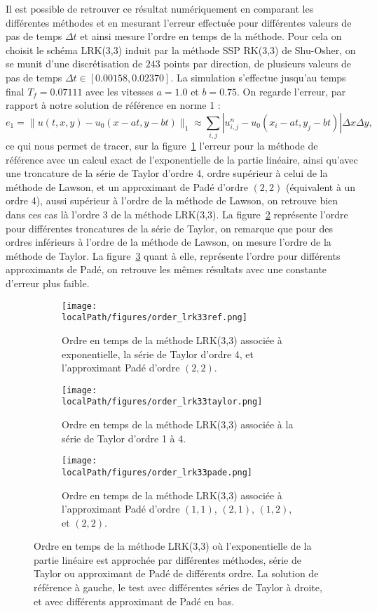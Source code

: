 Il est possible de retrouver ce résultat numériquement en comparant les différentes méthodes et en mesurant l'erreur effectuée pour différentes valeurs de pas de temps $\Delta t$ et ainsi mesure l'ordre en temps de la méthode. Pour cela on choisit le schéma LRK(3,3) induit par la méthode SSP RK(3,3) de Shu-Osher, on se munit d'une discrétisation de $243$ points par direction, de plusieurs valeurs de pas de temps $\Delta t\in[0.00158,0.02370]$. La simulation s'effectue jusqu'au temps final $T_f=0.07111$ avec les vitesses $a=1.0$ et $b=0.75$. On regarde l'erreur, par rapport à notre solution de référence en norme 1 :
$$
  e_1 = \| u(t,x,y) - u_0(x-at,y-bt) \|_1 \approx \sum_{i,j}|u^n_{i,j}-u_0(x_i-at,y_j-bt)|\Delta x\Delta y,
$$
ce qui nous permet de tracer, sur la figure~\ref{fig:lrk33ref} l'erreur pour la méthode de référence avec un calcul exact de l'exponentielle de la partie linéaire, ainsi qu'avec une troncature de la série de Taylor d'ordre 4, ordre supérieur à celui de la méthode de Lawson, et un approximant de Padé d'ordre $(2,2)$ (équivalent à un ordre 4), aussi supérieur à l'ordre de la méthode de Lawson, on retrouve bien dans ces cas là l'ordre 3 de la méthode LRK(3,3). La figure~\ref{fig:lrk33taylor} représente l'ordre pour différentes troncatures de la série de Taylor, on remarque que pour des ordres inférieurs à l'ordre de la méthode de Lawson, on mesure l'ordre de la méthode de Taylor. La figure~\ref{fig:lrk33pade} quant à elle, représente l'ordre pour différents approximants de Padé, on retrouve les mêmes résultats avec une constante d'erreur plus faible.

\begin{figure}
  \centering
  \begin{subfigure}{.45\textwidth}
    \centering
    \texttt{[image: \\localPath/figures/order\_lrk33ref.png]}
    \caption{Ordre en temps de la méthode LRK(3,3) associée à exponentielle, la série de Taylor d'ordre 4, et l'approximant Padé d'ordre $(2,2)$.}
    \label{fig:lrk33ref}
  \end{subfigure}
  \begin{subfigure}{.45\textwidth}
    \centering
    \texttt{[image: \\localPath/figures/order\_lrk33taylor.png]}
    \caption{Ordre en temps de la méthode LRK(3,3) associée à la série de Taylor d'ordre 1 à 4.\\ }
    \label{fig:lrk33taylor}
  \end{subfigure}
  \begin{subfigure}{.45\textwidth}
    \centering
    \texttt{[image: \\localPath/figures/order\_lrk33pade.png]}
    \caption{Ordre en temps de la méthode LRK(3,3) associée à l'approximant Padé d'ordre $(1,1)$, $(2,1)$, $(1,2)$, et $(2,2)$.}
    \label{fig:lrk33pade}
  \end{subfigure}
  \caption{Ordre en temps de la méthode LRK(3,3) où l'exponentielle de la partie linéaire est approchée par différentes méthodes, série de Taylor ou approximant de Padé de différents ordre. La solution de référence à gauche, le test avec différentes séries de Taylor à droite, et avec différents approximant de Padé en bas.}
  \label{fig:3:order}
\end{figure}
